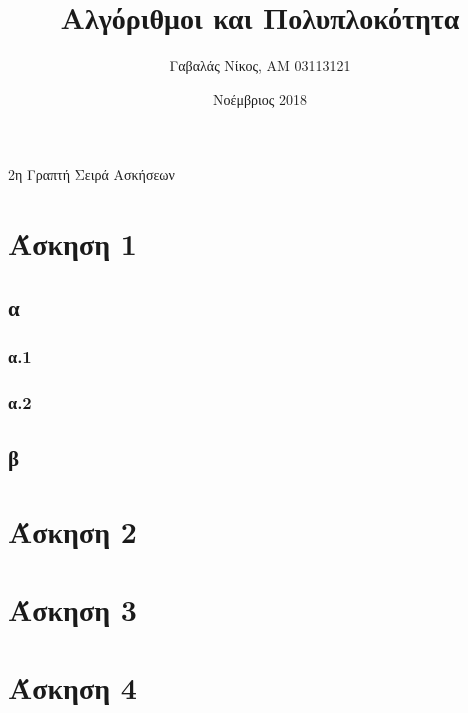 \documentclass[12pt,a4paper]{article}
\title{Αλγόριθμοι και Πολυπλοκότητα}
\author{Γαβαλάς Νίκος, AM 03113121}
\date{Νοέμβριος 2018}
\begin{document}

  \begin{center}
    \Large{2η Γραπτή Σειρά Ασκήσεων}
  \end{center}

  \section{Άσκηση 1}

  \subsection{α}
  
  \subsubsection{α.1}

  \begin{center}    
  \end{center}

  \subsubsection{α.2}

  \subsection{β}
  
  \section{Άσκηση 2}
  
  \section{Άσκηση 3}
  
  \section{Άσκηση 4}
  
\end{document}
